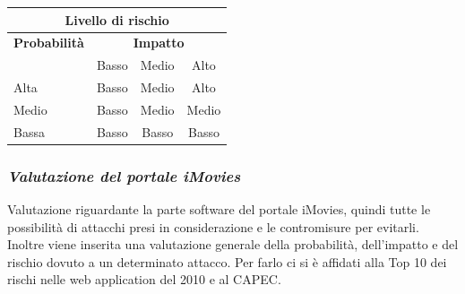 \documentclass{article}
\begin{document}
\begin{center}
\begin{tabular}{|l|c|c|c|}
\hline
\multicolumn{4}{|c|}{{\bf Livello di rischio}} \\
\hline
{{\bf Probabilità}} & \multicolumn{3}{c|}{{\bf Impatto}} \\ \cline{2-4}
     & Basso & Medio & Alto \\  \hline
 Alta & Basso & Medio & Alto  \\
\hline
 Medio & Basso & Medio & Medio \\
\hline
 Bassa & Basso & Basso & Basso \\
\hline
\end{tabular}
\end{center}

\subsubsection{{\it Valutazione del portale iMovies}}
Valutazione riguardante la parte software del portale iMovies, quindi tutte le possibilità di attacchi presi in considerazione e le contromisure per evitarli. Inoltre viene inserita una valutazione generale della probabilità, dell'impatto e del rischio dovuto a un determinato attacco. Per farlo ci si è affidati alla Top 10 dei rischi nelle web application del 2010 \cite{owasp} e al CAPEC.\\ 
\noindent
\end{document}
